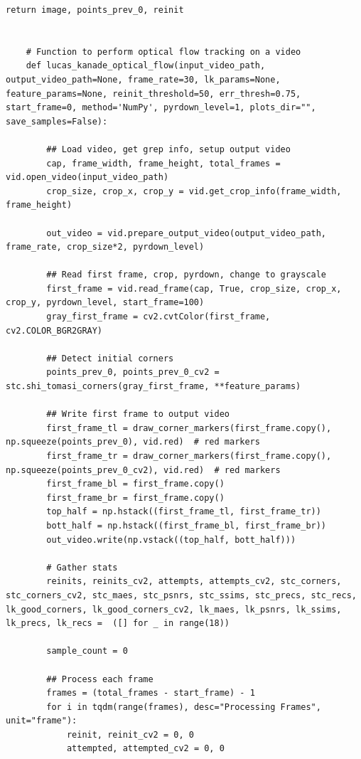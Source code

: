 \documentclass[11pt, conference, letterpaper]{IEEEtran}
\begin{document}
\begin{lstlisting}[style=python, caption={\texttt{lucas\_kanade.py}}, label={lst:lk}]
            return image, points_prev_0, reinit
    
    
    # Function to perform optical flow tracking on a video
    def lucas_kanade_optical_flow(input_video_path, output_video_path=None, frame_rate=30, lk_params=None, feature_params=None, reinit_threshold=50, err_thresh=0.75, start_frame=0, method='NumPy', pyrdown_level=1, plots_dir="", save_samples=False):
    
        ## Load video, get grep info, setup output video
        cap, frame_width, frame_height, total_frames = vid.open_video(input_video_path)
        crop_size, crop_x, crop_y = vid.get_crop_info(frame_width, frame_height)
    
        out_video = vid.prepare_output_video(output_video_path, frame_rate, crop_size*2, pyrdown_level)
        
        ## Read first frame, crop, pyrdown, change to grayscale
        first_frame = vid.read_frame(cap, True, crop_size, crop_x, crop_y, pyrdown_level, start_frame=100)
        gray_first_frame = cv2.cvtColor(first_frame, cv2.COLOR_BGR2GRAY)
    
        ## Detect initial corners
        points_prev_0, points_prev_0_cv2 = stc.shi_tomasi_corners(gray_first_frame, **feature_params)
        
        ## Write first frame to output video
        first_frame_tl = draw_corner_markers(first_frame.copy(), np.squeeze(points_prev_0), vid.red)  # red markers
        first_frame_tr = draw_corner_markers(first_frame.copy(), np.squeeze(points_prev_0_cv2), vid.red)  # red markers
        first_frame_bl = first_frame.copy()
        first_frame_br = first_frame.copy()
        top_half = np.hstack((first_frame_tl, first_frame_tr))
        bott_half = np.hstack((first_frame_bl, first_frame_br))
        out_video.write(np.vstack((top_half, bott_half)))
    
        # Gather stats
        reinits, reinits_cv2, attempts, attempts_cv2, stc_corners, stc_corners_cv2, stc_maes, stc_psnrs, stc_ssims, stc_precs, stc_recs, lk_good_corners, lk_good_corners_cv2, lk_maes, lk_psnrs, lk_ssims, lk_precs, lk_recs =  ([] for _ in range(18))
        
        sample_count = 0
        
        ## Process each frame
        frames = (total_frames - start_frame) - 1
        for i in tqdm(range(frames), desc="Processing Frames", unit="frame"):
            reinit, reinit_cv2 = 0, 0
            attempted, attempted_cv2 = 0, 0
                       

\end{lstlisting}
\end{document}
